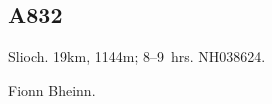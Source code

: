 
\subsection{A832}

\begin{munros}
\item\target
Slioch.  19km, 1144m; 8--9~hrs.  NH038624.  \tick

\item
Fionn Bheinn.
\end{munros}
